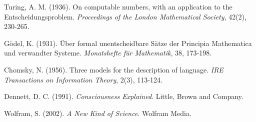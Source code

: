 \documentclass[11pt,a4paper]{article}
\begin{document}
    
    \begin{thebibliography}{99}

        Turing, A. M. (1936).
        On computable numbers, with an application to the Entscheidungsproblem.
        \textit{Proceedings of the London Mathematical Society}, 42(2), 230-265.

        Gödel, K. (1931).
        Über formal unentscheidbare Sätze der Principia Mathematica und verwandter Systeme.
        \textit{Monatshefte für Mathematik}, 38, 173-198.

        Chomsky, N. (1956).
        Three models for the description of language.
        \textit{IRE Transactions on Information Theory}, 2(3), 113-124.

        Dennett, D. C. (1991).
        \textit{Consciousness Explained}.
        Little, Brown and Company.

        Wolfram, S. (2002).
        \textit{A New Kind of Science}.
        Wolfram Media.

    \end{thebibliography}
\end{document}
